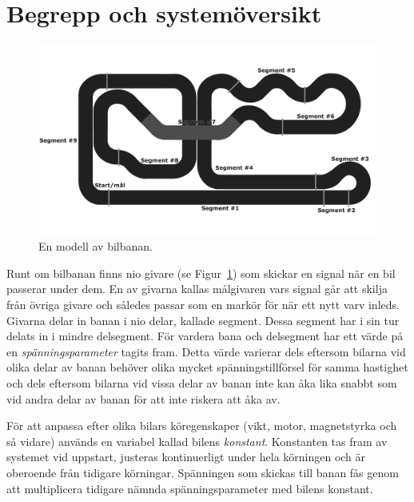 \section{Begrepp och systemöversikt}
\label{sec:begrepp och systemöversikt}

\begin{figure}
	\centering
	\includegraphics[width=\linewidth] {Figures/BanaModell}
	\caption{En modell av bilbanan.}
	\label{fig:bilbanan}
\end{figure} 

Runt om bilbanan finns nio givare (se Figur~\ref{fig:bilbanan}) som skickar en
signal när en bil passerar under dem. En av givarna kallas målgivaren vars
signal går att skilja från övriga givare och således passar som en markör för
när ett nytt varv inleds.  Givarna delar in banan i nio delar, kallade segment.
Dessa segment har i sin tur delats in i mindre delsegment. För vardera bana och
delsegment har ett värde på en \emph{spänningsparameter} tagits fram. Detta
värde varierar dels eftersom bilarna vid olika delar av banan behöver olika
mycket spänningstillförsel för samma hastighet och dels eftersom bilarna vid
vissa delar av banan inte kan åka lika snabbt som vid andra delar av banan för
att inte riskera att åka av.

För att anpassa efter olika bilars köregenskaper (vikt, motor, magnetstyrka och
så vidare) används en variabel kallad bilens \emph{konstant}. Konstanten tas
fram av systemet vid uppstart, justeras kontinuerligt under hela körningen och
är oberoende från tidigare körningar. Spänningen som skickas till banan
fås genom att multiplicera tidigare nämnda spänningsparameter med bilens
konstant.


